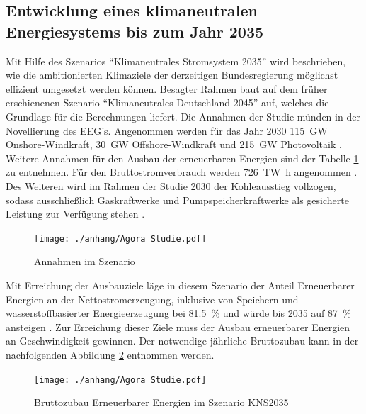 	
	\subsection{Entwicklung eines klimaneutralen Energiesystems bis zum Jahr 2035} \label{sect: 2030} 
		
		Mit Hilfe des Szenarios "`Klimaneutrales Stromsystem 2035"' wird beschrieben, wie die ambitionierten Klimaziele der derzeitigen Bundesregierung möglichst effizient umgesetzt werden können. 
		Besagter Rahmen baut auf dem früher erschienenen Szenario "`Klimaneutrales Deutschland 2045"' auf, welches die Grundlage für die Berechnungen liefert. 
		Die Annahmen der Studie münden in der Novellierung des EEG's. 
		Angenommen werden für das Jahr 2030 \SI{115}{\giga\watt} Onshore-Windkraft, \SI{30}{\giga\watt} Offshore-Windkraft und \SI{215}{\giga\watt} Photovoltaik \cite[S.22]{Agora_KlimaneutralesStromsystem}. 
		Weitere Annahmen für den Ausbau der erneuerbaren Energien sind der Tabelle \ref{Abb. Annahmen Agora2035} zu entnehmen.
		Für den Bruttostromverbrauch werden \SI{726}{\tera\watt\hour} angenommen \cite[S.33]{Agora_KlimaneutralesStromsystem}. 
		Des Weiteren wird im Rahmen der Studie 2030 der Kohleausstieg vollzogen, sodass ausschließlich Gaskraftwerke und Pumpspeicherkraftwerke als gesicherte Leistung zur Verfügung stehen \cite[S.31]{Agora_KlimaneutralesStromsystem}. 
		
		\begin{figure} [H]
			\centering
			\label{Abb. Annahmen Agora2035} 
			\texttt{[image: ./anhang/Agora Studie.pdf]}
			\caption{Annahmen im Szenario \cite[S.22]{Agora_KlimaneutralesStromsystem}}
		\end{figure}
	
		Mit Erreichung der Ausbauziele läge in diesem Szenario der Anteil Erneuerbarer Energien an der Nettostromerzeugung, inklusive von Speichern und wasserstoffbasierter Energieerzeugung bei \SI{81,5}{\percent} und würde bis 2035 auf \SI{87}{\percent} ansteigen \cite[S.23]{Agora_KlimaneutralesStromsystem}.  
		Zur Erreichung dieser Ziele muss der Ausbau erneuerbarer Energien an Geschwindigkeit gewinnen. 
		Der notwendige jährliche Bruttozubau kann in der nachfolgenden Abbildung \ref{Abb.Zubau PV Agora2035} entnommen werden. 
		
		\begin{figure} [H]
			\centering
			\label{Abb.Zubau PV Agora2035} 
			\texttt{[image: ./anhang/Agora Studie.pdf]}
			\caption{Bruttozubau Erneuerbarer Energien im Szenario KNS2035 \cite[S.24]{Agora_KlimaneutralesStromsystem}}
		\end{figure}
	
